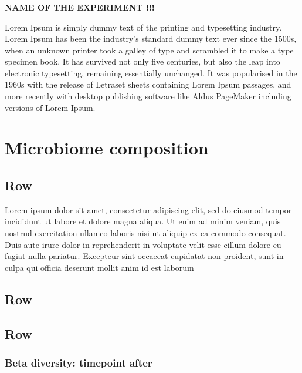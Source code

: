 \documentclass[
]{article}
\begin{document}
\hypertarget{section-1}{%
\subsubsection{}\label{section-1}}

\textbf{NAME OF THE EXPERIMENT !!! }

Lorem Ipsum is simply dummy text of the printing and typesetting
industry. Lorem Ipsum has been the industry's standard dummy text ever
since the 1500s, when an unknown printer took a galley of type and
scrambled it to make a type specimen book. It has survived not only five
centuries, but also the leap into electronic typesetting, remaining
essentially unchanged. It was popularised in the 1960s with the release
of Letraset sheets containing Lorem Ipsum passages, and more recently
with desktop publishing software like Aldus PageMaker including versions
of Lorem Ipsum.

\hypertarget{microbiome-composition}{%
\section{Microbiome composition}\label{microbiome-composition}}

\hypertarget{row-1}{%
\subsection{Row}\label{row-1}}

Lorem ipsum dolor sit amet, consectetur adipiscing elit, sed do eiusmod
tempor incididunt ut labore et dolore magna aliqua. Ut enim ad minim
veniam, quis nostrud exercitation ullamco laboris nisi ut aliquip ex ea
commodo consequat. Duis aute irure dolor in reprehenderit in voluptate
velit esse cillum dolore eu fugiat nulla pariatur. Excepteur sint
occaecat cupidatat non proident, sunt in culpa qui officia deserunt
mollit anim id est laborum

\hypertarget{row-2}{%
\subsection{Row}\label{row-2}}

\hypertarget{row-3}{%
\subsection{Row}\label{row-3}}

\hypertarget{beta-diversity-timepoint-after}{%
\subsubsection{Beta diversity: timepoint
after}\label{beta-diversity-timepoint-after}}
\end{document}
